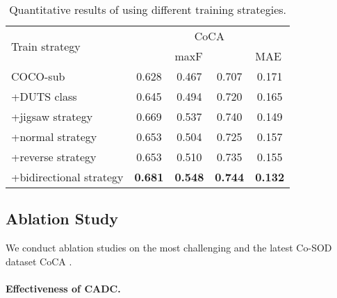 \documentclass[10pt,twocolumn,letterpaper]{article}
\begin{document}
\begin{table}[]
\centering
\small
\caption{Quantitative results of using different training strategies.
}
\begin{tabular}{l|l|cccc}
\hline
\multicolumn{2}{l|}{\multirow{2}{*}{Train strategy}} & \multicolumn{4}{c}{CoCA} \\
\multicolumn{2}{l|}{}                      & \multicolumn{1}{l}{} & \multicolumn{1}{l}{maxF } & \multicolumn{1}{l}{} & \multicolumn{1}{l}{MAE }   \\ \hline

\multicolumn{2}{l|}{COCO-sub}    &0.628	&0.467 &0.707 &0.171   \\ \hline
\multicolumn{2}{l|}{+DUTS class \cite{zhang2020gicd}}  &0.645 &0.494 &0.720 &0.165 \\
\multicolumn{2}{l|}{+jigsaw strategy \cite{zhang2020gicd}}   &0.669	&0.537 &0.740 &0.149 \\ \hline
\multicolumn{2}{l|}{+normal strategy}                       &0.653 &0.504 &0.725 &0.157  \\
\multicolumn{2}{l|}{+reverse strategy}                      &0.653 &0.510 &0.735	&0.155\\
\multicolumn{2}{l|}{+bidirectional strategy}            &\textbf{0.681} &\textbf{0.548} &\textbf{0.744} &\textbf{0.132}\\ \hline
\end{tabular}
\label{strategy}
\end{table}


\subsection{Ablation Study}

We conduct ablation studies on the most challenging and the latest Co-SOD dataset CoCA \cite{zhang2020gicd}.

\paragraph{Effectiveness of CADC.}
\end{document}

